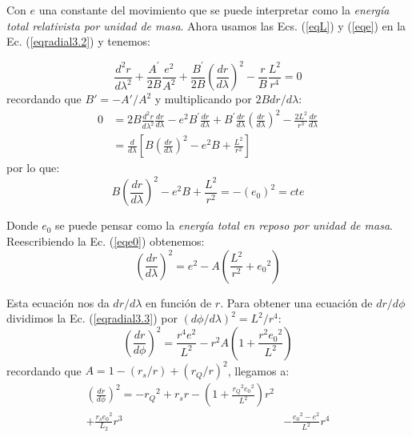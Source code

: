Con $e$ una constante del movimiento que se puede interpretar como la \textit{energía total relativista por unidad de masa}. Ahora usamos las Ecs. (\ref{eqL}) y (\ref{eqe}) en la Ec. (\ref{eqradial3.2}) y tenemos:

\begin{equation}
    \frac{d^2 r}{d \lambda^2} + \frac{A^\prime}{2B} \frac{e^2}{A^2} + \frac{B^\prime}{2B} \left(\frac{d r}{d \lambda}\right)^2 - \frac{r}{B} \frac{L^2}{r^4} = 0
\end{equation}
recordando que $B\prime=-A\prime/A^2$ y multiplicando por $2Bdr/d\lambda$:
\begin{equation}
\begin{split}
    0&=2B\frac{d^2 r}{d \lambda^2}\frac{dr}{d\lambda} - e^2 B^\prime \frac{dr}{d\lambda} + B^\prime \frac{dr}{d\lambda} \left(\frac{d r}{d \lambda}\right)^2 - \frac{2L^2}{r^3} \frac{dr}{d\lambda}\\
    &=\frac{d}{d\lambda}\left[ B \left(\frac{d r}{d \lambda}\right)^2 - e^2 B + \frac{L^2}{r^2}\right]
\end{split}
\end{equation}
por lo que:
\begin{equation}
    B \left(\frac{d r}{d \lambda}\right)^2 - e^2 B + \frac{L^2}{r^2} = -(e_0)^2 = cte
\label{eqe0}
\end{equation}

Donde $e_0$ se puede pensar como la \textit{energía total en reposo por unidad de masa}. Reescribiendo la Ec. (\ref{eqe0}) obtenemos:
\begin{equation}
    \left(\frac{d r}{d \lambda}\right)^2 = e^2 -A\left( \frac{L^2}{r^2} + {e_0}^2\right)
\label{eqradial3.3}
\end{equation}

Esta ecuación nos da $dr/d\lambda$ en función de $r$. Para obtener una ecuación de $dr/d\phi$ dividimos la Ec. (\ref{eqradial3.3}) por $(d\phi/d\lambda)^2 = L^2/r^4$:
\begin{equation}
    \left( \frac{dr}{d\phi} \right)^2 = \frac{r^4 e^2}{L^2} - r^2 A \left(1 + \frac{r^2 {e_0}^2}{L^2} \right)
\end{equation}
recordando que $A=1 - (r_s/r) + (r_Q/r)^2$, llegamos a:
\begin{equation}
\begin{split}
    \left( \frac{dr}{d\phi} \right)^2 = -{r_Q}^2 + r_s r - \left(1 + \frac{{r_Q}^2 {e_0}^2}{L^2} \right) r^2 &\\+ \frac{r_s {e_0}^2}{L_2} r^3 &- \frac{{e_0}^2 - e^2}{L^2} r^4
\end{split}
\label{eqrposta}
\end{equation}

